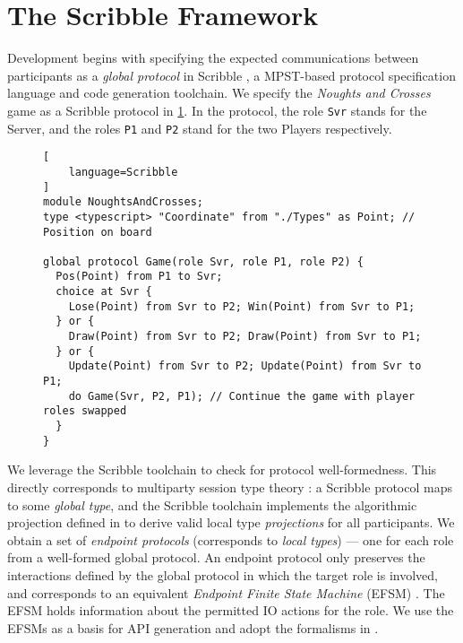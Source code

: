 \section{The Scribble Framework}
\label{section:scribble}

Development begins with specifying the expected communications between
participants as a \textit{global protocol} in Scribble \cite{Scribble}, a
MPST-based protocol specification language and code generation toolchain.
We specify the \textit{Noughts and Crosses} game as a Scribble protocol in
\cref{lst:game}.
In the protocol, the role \texttt{Svr} stands for the Server, and the roles
\texttt{P1} and \texttt{P2} stand for the two Players respectively.

\begin{figure}[!h]
\begin{lstlisting}[
	language=Scribble
]
module NoughtsAndCrosses;
type <typescript> "Coordinate" from "./Types" as Point;	// Position on board

global protocol Game(role Svr, role P1, role P2) {
  Pos(Point) from P1 to Svr;
  choice at Svr {
    Lose(Point) from Svr to P2; Win(Point) from Svr to P1;
  } or {
    Draw(Point) from Svr to P2; Draw(Point) from Svr to P1;
  } or {
    Update(Point) from Svr to P2; Update(Point) from Svr to P1;
    do Game(Svr, P2, P1); // Continue the game with player roles swapped
  }
}
\end{lstlisting}
\label{lst:game}
\end{figure}

We leverage the Scribble toolchain to check for protocol
well-formedness.
This directly corresponds to multiparty session
type theory \cite{FeatherweightScribble}:
a Scribble protocol maps to some \textit{global type}, and the Scribble
toolchain implements the algorithmic projection defined in \cite{MPST} to
derive valid local type \textit{projections} for all participants.
We obtain a set of \textit{endpoint protocols} (corresponds to \emph{local
  types}) --- one for each role from a
well-formed global protocol.
An endpoint protocol only preserves the interactions defined by the global
protocol in which the target role is involved, and corresponds to an equivalent
\textit{Endpoint Finite State Machine} (EFSM) \cite{ICALP13CFSM}.
The EFSM holds information about the permitted IO actions for the role.
We use the EFSMs as a basis for API generation and adopt the formalisms in
\cite{Hybrid2016}.


